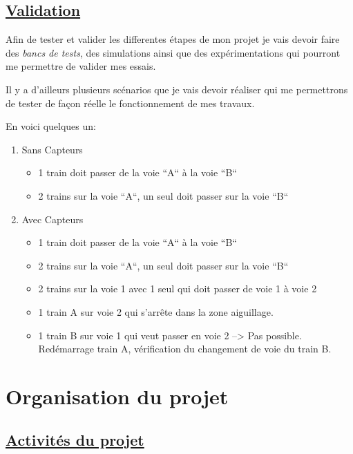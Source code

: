 \subsection{\underline{ Validation}}
\label{sec:valid}

Afin de tester et valider les differentes \'etapes de mon projet je vais
devoir faire des \emph{bancs de tests}, des simulations ainsi que des
exp\'erimentations qui pourront me permettre de valider mes essais.

Il y a d'ailleurs plusieurs sc\'enarios que je vais devoir r\'ealiser qui
me permettrons de tester de façon r\'eelle le fonctionnement de mes travaux.

En voici quelques un:

\begin{enumerate}[A]
  \item Sans Capteurs
  \begin{itemize}
    \item 1 train doit passer de la voie ``A`` à la voie ``B``
    \item 2 trains sur la voie ``A``, un seul doit passer sur la voie
       ``B``
  \end{itemize}

  \item Avec Capteurs
  \begin{itemize}
    \item 1 train doit passer de la voie ``A`` à la voie ``B``
    \item 2 trains sur la voie ``A``, un seul doit passer sur la voie ``B``
    \item 2 trains sur la voie 1 avec 1 seul qui doit passer de voie 1 à voie 2
    \item 1 train A sur voie 2 qui s'arrête dans la zone aiguillage.
    \item 1 train B sur voie 1 qui veut passer en voie 2 --> Pas
       possible. Red\'emarrage train A, v\'erification du changement de
       voie du train B.
  \end{itemize}
\end{enumerate}

\section{Organisation du projet}
\label{sec:org_proj}

\subsection{\underline{ Activit\'es du projet}}
\label{sec:activ}

